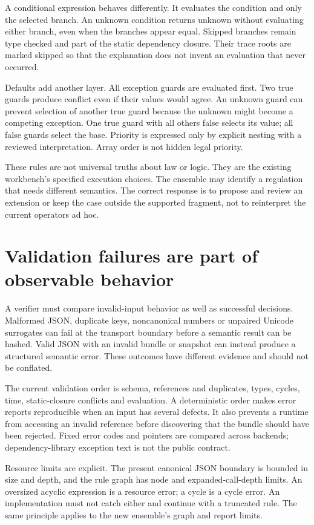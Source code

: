 A conditional expression behaves differently. It evaluates the condition and
only the selected branch. An unknown condition returns unknown without evaluating
either branch, even when the branches appear equal. Skipped branches remain type
checked and part of the static dependency closure. Their trace roots are marked
skipped so that the explanation does not invent an evaluation that never occurred.

Defaults add another layer. All exception guards are evaluated first. Two true
guards produce conflict even if their values would agree. An unknown guard can
prevent selection of another true guard because the unknown might become a
competing exception. One true guard with all others false selects its value; all
false guards select the base. Priority is expressed only by explicit nesting with
a reviewed interpretation. Array order is not hidden legal priority.

These rules are not universal truths about law or logic. They are the existing
workbench's specified execution choices. The ensemble may identify a regulation
that needs different semantics. The correct response is to propose and review an
extension or keep the case outside the supported fragment, not to reinterpret
the current operators ad hoc.

\section{Validation failures are part of observable behavior}

A verifier must compare invalid-input behavior as well as successful decisions.
Malformed JSON, duplicate keys, noncanonical numbers or unpaired Unicode
surrogates can fail at the transport boundary before a semantic result can be
hashed. Valid JSON with an invalid bundle or snapshot can instead produce a
structured semantic error. These outcomes have different evidence and should
not be conflated.

The current validation order is schema, references and duplicates, types, cycles,
time, static-closure conflicts and evaluation. A deterministic order makes error
reports reproducible when an input has several defects. It also prevents a
runtime from accessing an invalid reference before discovering that the bundle
should have been rejected. Fixed error codes and pointers are compared across
backends; dependency-library exception text is not the public contract.

Resource limits are explicit. The present canonical JSON boundary is bounded in
size and depth, and the rule graph has node and expanded-call-depth limits. An
oversized acyclic expression is a resource error; a cycle is a cycle error. An
implementation must not catch either and continue with a truncated rule. The
same principle applies to the new ensemble's graph and report limits.

